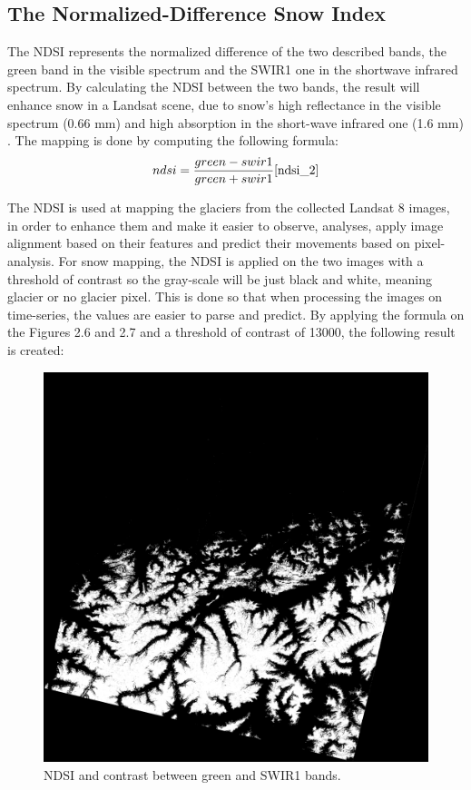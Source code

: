 \documentclass[12pt, a4paper]{report}
\begin{document}
  	\subsection{The Normalized-Difference Snow Index}
  	The NDSI represents the normalized difference of the two described bands, the green band in the visible spectrum and the SWIR1 one in the shortwave infrared spectrum. By calculating the NDSI between the two bands, the result will enhance snow in a Landsat scene, due to snow's high reflectance in the visible spectrum (0.66 mm) and high absorption in the short-wave infrared one (1.6 mm) \cite{ndsi_1, ndsi_2}. The mapping is done by computing the following formula:
  	\[ndsi = \frac{green - swir1}{green + swir1}    \cite{ndsi_2}\]
  	
  	The NDSI is used at mapping the glaciers from the collected Landsat 8 images, in order to enhance them and make it easier to observe, analyses, apply image alignment based on their features and predict their movements based on pixel-analysis. For snow mapping, the NDSI is applied on the two images with a threshold of contrast so the gray-scale will be just black and white, meaning glacier or no glacier pixel. This is done so that when processing the images on time-series, the values are easier to parse and predict. By applying the formula on the Figures 2.6 and 2.7 and a threshold of contrast of 13000, the following result is created:
  	\begin{figure}[H]
  		\centering
  		\includegraphics[scale=1]{result(2).png}
  		\caption{NDSI and contrast between green and SWIR1 bands.}
  		\label{fig:ndsi}
  	\end{figure}
  	
\end{document}
